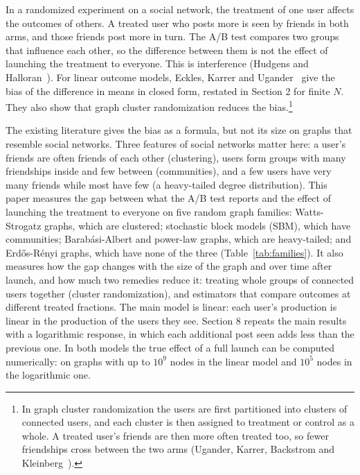 \documentclass[final,5p,times,twocolumn,number]{elsarticle}
\begin{document}
In a randomized experiment on a social network, the treatment of one user affects the outcomes of others. A treated user who posts more is seen by friends in both arms, and those friends post more in turn. The A/B test compares two groups that influence each other, so the difference between them is not the effect of launching the treatment to everyone. This is interference (Hudgens and Halloran~\cite{r13}). For linear outcome models, Eckles, Karrer and Ugander~\cite{r8} give the bias of the difference in means in closed form, restated in Section 2 for finite $N$. They also show that graph cluster randomization reduces the bias.\footnote{In graph cluster randomization the users are first partitioned into clusters of connected users, and each cluster is then assigned to treatment or control as a whole. A treated user's friends are then more often treated too, so fewer friendships cross between the two arms (Ugander, Karrer, Backstrom and Kleinberg~\cite{r21}).}


The existing literature gives the bias as a formula, but not its size on graphs that resemble social networks. Three features of social networks matter here: a user's friends are often friends of each other (clustering), users form groups with many friendships inside and few between (communities), and a few users have very many friends while most have few (a heavy-tailed degree distribution). This paper measures the gap between what the A/B test reports and the effect of launching the treatment to everyone on five random graph families: Watts-Strogatz graphs, which are clustered; stochastic block models (SBM), which have communities; Barabási-Albert and power-law graphs, which are heavy-tailed; and Erdős-Rényi graphs, which have none of the three (Table~\ref{tab:families}). It also measures how the gap changes with the size of the graph and over time after launch, and how much two remedies reduce it: treating whole groups of connected users together (cluster randomization), and estimators that compare outcomes at different treated fractions. The main model is linear: each user's production is linear in the production of the users they see. Section 8 repeats the main results with a logarithmic response, in which each additional post seen adds less than the previous one. In both models the true effect of a full launch can be computed numerically: on graphs with up to $10^9$  nodes in the linear model and $10^5$  nodes in the logarithmic one.
\end{document}
